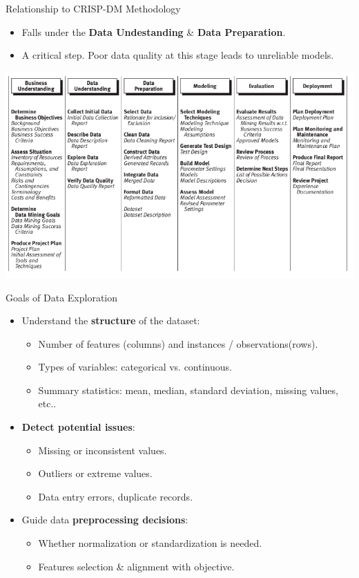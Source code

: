 \documentclass[aspectratio=169,xcolor=dvipsnames]{beamer}
\begin{document}
\begin{frame}{Relationship to CRISP-DM Methodology}
\begin{itemize}
	\setlength\itemsep{0.1cm}
	\item Falls under the \textbf{Data Undestanding} \& \textbf{Data Preparation}.
	\item A critical step. Poor data quality at this stage leads to unreliable models.
\end{itemize}
\centering
\includegraphics[scale=0.33]{images/crisp-dm-fig.png}
\end{frame}
\begin{frame}{Goals of Data Exploration}
\begin{itemize}
	\setlength\itemsep{0.25cm}
	\item Understand the \textbf{structure} of the dataset:
		\begin{itemize}
			\item Number of features (columns) and instances / observations(rows).
			\item Types of variables: categorical vs. continuous.
			\item Summary statistics: mean, median, standard deviation, missing values, etc..
		\end{itemize}
	\item \textbf{Detect potential issues}:
		\begin{itemize}
			\item Missing or inconsistent values.
			\item Outliers or extreme values.
			\item Data entry errors, duplicate records.
		\end{itemize}
	\item Guide data \textbf{preprocessing decisions}:
		\begin{itemize}
			\item Whether normalization or standardization is needed.
			\item Features selection \& alignment with objective.
		\end{itemize}
\end{itemize}
\end{frame}
\end{document}
